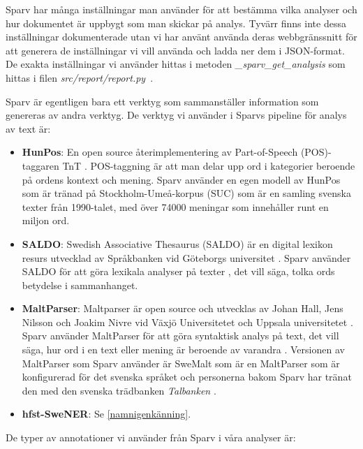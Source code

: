 \documentclass[swedish]{maucsthesis}
\begin{document}
Sparv har många inställningar man använder för att bestämma vilka analyser och hur dokumentet är uppbygt som man skickar på analys. Tyvärr finns inte dessa inställningar dokumenterade utan vi har använt använda deras webbgränssnitt \cite{sparv:2019} för att generera de inställningar vi vill använda och ladda ner dem i JSON-format. De exakta inställningar vi använder hittas i metoden \textit{\_sparv\_get\_analysis} som hittas i filen \textit{src/report/report.py}~\cite{kalle:2019}.

Sparv är egentligen bara ett verktyg som sammanställer
information som genereras av andra verktyg.
De verktyg vi använder i Sparvs pipeline för analys av text är:

\begin{itemize}
\item \textbf{HunPos}: En open source återimplementering av Part-of-Speech (POS)-taggaren TnT \cite{halacsy:2007}. POS-taggning är att man delar upp ord i kategorier beroende på ordens kontext och mening. Sparv använder en egen modell av HunPos som är tränad på Stockholm-Umeå-korpus (SUC) \cite{borin:2016} som är en samling svenska texter från 1990-talet, med över 74000 meningar som innehåller runt en miljon ord.
\item \textbf{SALDO}: Swedish Associative Thesaurus (SALDO) är en digital lexikon resurs utvecklad av Språkbanken vid Göteborgs universitet \cite{borin:2014}. Sparv använder SALDO för att göra lexikala analyser på texter \cite{borin:2016}, det vill säga, tolka ords betydelse i sammanhanget. 
\item \textbf{MaltParser}: Maltparser är open source och utvecklas av Johan Hall, Jens Nilsson och Joakim Nivre vid Växjö Universitetet och Uppsala universitetet \cite{nivre:2007}. Sparv använder MaltParser för att göra syntaktisk analys på text, det vill säga, hur ord i en text eller mening är beroende av varandra \cite{borin:2016}. Versionen av MaltParser som Sparv använder är SweMalt som är en MaltParser som är konfigurerad för det svenska språket och personerna bakom Sparv har tränat den med den svenska trädbanken \textit{Talbanken} \cite{borin:2016}. 
\item \textbf{hfst-SweNER}: Se \cref{namnigenkänning}.
\end{itemize}


De typer av annotationer vi använder från Sparv i våra analyser är:
\end{document}
